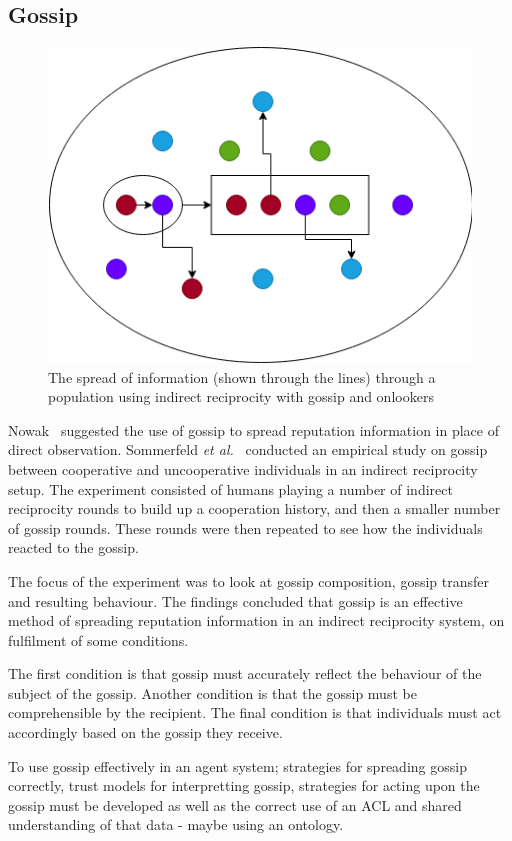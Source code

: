 \documentclass[]{final_report}
\begin{document}
\subsection{Gossip}
\begin{figure}
\vspace{-20pt}
\begin{framed}
	\center
	\includegraphics[width=\textwidth]{Gossip_and_onlookers.png}
	\caption{The spread of information (shown through the lines) through a population using indirect reciprocity with gossip and onlookers}
	\label{fig:gossip_and_onlookers}
\end{framed}
\vspace{-20pt}
\end{figure}
Nowak~\cite{five_rules_coop} suggested the use of gossip to spread reputation information in place of direct observation. Sommerfeld \textit{et al.}~\cite{gossip_alt} conducted an empirical study on gossip between cooperative and uncooperative individuals in an indirect reciprocity setup. The experiment consisted of humans playing a number of indirect reciprocity rounds to build up a cooperation history, and then a smaller number of gossip rounds. These rounds were then repeated to see how the individuals reacted to the gossip.\par
The focus of the experiment was to look at gossip composition, gossip transfer and resulting behaviour. The findings concluded that gossip is an effective method of spreading reputation information in an indirect reciprocity system, on fulfilment of some conditions.\par 
The first condition is that gossip must accurately reflect the behaviour of the subject of the gossip. Another condition is that the gossip must be comprehensible by the recipient. The final condition is that individuals must act accordingly based on the gossip they receive.\par
To use gossip effectively in an agent system; strategies for spreading gossip correctly, trust models for interpretting gossip, strategies for acting upon the gossip must be developed as well as the correct use of an ACL and shared understanding of that data - maybe using an ontology.
\end{document}

